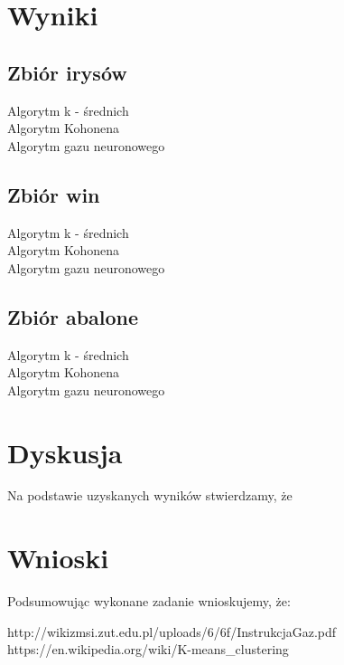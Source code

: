 \documentclass{classrep}
\begin{document}
\section{Wyniki}
{
	\subsection{Zbiór irysów}
	{
		Algorytm k - średnich\\


		Algorytm Kohonena\\


		Algorytm gazu neuronowego\\
	}
	\subsection{Zbiór win}
	{
		Algorytm k - średnich\\


		Algorytm Kohonena\\


		Algorytm gazu neuronowego\\
	}
	\subsection{Zbiór abalone}
	{
		Algorytm k - średnich\\


		Algorytm Kohonena\\


		Algorytm gazu neuronowego\\
	}
}

\section{Dyskusja}
{
	Na podstawie uzyskanych wyników stwierdzamy, że
}

\section{Wnioski}
{
	Podsumowując wykonane zadanie wnioskujemy, że:\\
}

\begin{thebibliography}{0}
   http://wikizmsi.zut.edu.pl/uploads/6/6f/InstrukcjaGaz.pdf
    https://en.wikipedia.org/wiki/K-means\_clustering
\end{thebibliography}

{

}
\end{document}
